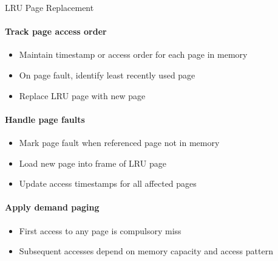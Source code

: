 \begin{KR}{LRU Page Replacement}
    \paragraph{Track page access order}
    \begin{itemize}
        \item Maintain timestamp or access order for each page in memory
        \item On page fault, identify least recently used page
        \item Replace LRU page with new page
    \end{itemize}
    
    \paragraph{Handle page faults}
    \begin{itemize}
        \item Mark page fault when referenced page not in memory
        \item Load new page into frame of LRU page
        \item Update access timestamps for all affected pages
    \end{itemize}
    
    \paragraph{Apply demand paging}
    \begin{itemize}
        \item First access to any page is compulsory miss
        \item Subsequent accesses depend on memory capacity and access pattern
    \end{itemize}
\end{KR}

